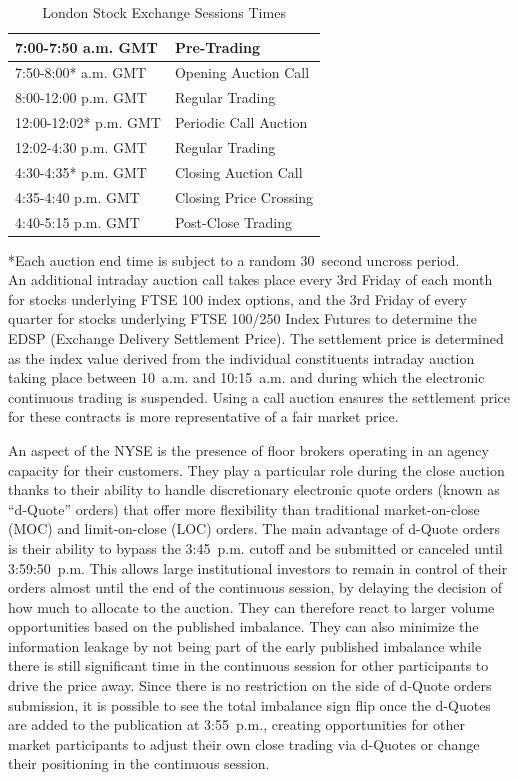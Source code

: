 	\begin{table}[!ht]
  	\centering
   	\caption{London Stock Exchange Sessions Times\label{tab:LSEclose}}
   	\begin{tabular}{ll} 
	7:00-7:50 a.m. GMT & Pre-Trading  \\ \hline
	7:50-8:00* a.m. GMT & Opening Auction Call\\ \hline
	8:00-12:00 p.m. GMT & Regular Trading \\ \hline
	12:00-12:02* p.m. GMT & Periodic Call Auction \\ \hline
	12:02-4:30 p.m. GMT & Regular Trading \\ \hline
	4:30-4:35* p.m. GMT & Closing Auction Call \\ \hline
	4:35-4:40 p.m. GMT & Closing Price Crossing \\ \hline	
	4:40-5:15 p.m. GMT & Post-Close Trading
   	\end{tabular}
	\begin{minipage}[t]{1\textwidth}
	\small{*Each auction end time is subject to a random 30~second uncross period.\\}
	\small{An additional intraday auction call takes place every 3rd Friday of each month for stocks underlying FTSE 100 index options, and the 3rd Friday of every quarter for stocks underlying FTSE 100/250 Index Futures to determine the EDSP (Exchange Delivery Settlement Price). The settlement price is determined as the index value derived from the individual constituents intraday auction taking place between 10~a.m. and 10:15~a.m. and during which the electronic continuous trading is suspended. Using a call auction ensures the settlement price for these contracts is more representative of a fair market price.}
	\end{minipage}   
	\end{table}	

An aspect of the NYSE is the presence of floor brokers operating in an agency capacity for their customers. They play a particular role during the close auction thanks to their ability to handle discretionary electronic quote orders (known as ``d-Quote'' orders) that offer more flexibility than traditional market-on-close (MOC) and limit-on-close (LOC) orders. The main advantage of d-Quote orders is their ability to bypass the 3:45~p.m. cutoff and be submitted or canceled until 3:59:50~p.m. This allows large institutional investors to remain in control of their orders almost until the end of the continuous session, by delaying the decision of how much to allocate to the auction. They can therefore react to larger volume opportunities based on the published imbalance. They can also minimize the information leakage by not being part of the early published imbalance while there is still significant time in the continuous session for other participants to drive the price away.  Since there is no restriction on the side of d-Quote orders submission, it is possible to see the total imbalance sign flip once the d-Quotes are added to the publication at 3:55~p.m., creating opportunities for other market participants to adjust their own close trading via d-Quotes or change their positioning in the continuous session. \label{in:fund_trade2} \label{in:close3}



